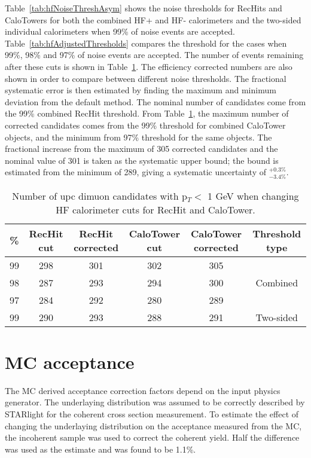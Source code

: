     Table~\ref{tab:hfNoiseThreshAsym} shows the noise thresholds for RecHits 
      and CaloTowers for both the combined HF+ and HF- calorimeters and the 
      two-sided individual calorimeters when 99\% of noise events are accepted.
    Table~\ref{tab:hfAdjustedThresholds} compares the threshold for the cases 
      when 99\%, 98\% and 97\% of noise events are accepted.
    The number of \JPsi{} events remaining after these cuts is shown in 
      Table~\ref{tab:hfAdjThreshYields}. 
    The efficiency corrected numbers are also shown in order to compare between
      different noise thresholds. 
    The fractional systematic error is then estimated by finding the maximum 
      and minimum deviation from the default method. 
    The nominal number of candidates come from the 99\% combined RecHit 
      threshold.
    From Table~\ref{tab:hfAdjThreshYields}, the maximum number of corrected 
      candidates comes from the 99\% threshold for combined CaloTower objects,
      and the minimum from 97\% threshold for the same objects. 
    The fractional increase from the maximum of 305 corrected candidates and 
      the nominal value of 301 is taken as the systematic upper bound; the 
      bound is estimated from the minimum of 289, giving a systematic 
      uncertainty of $^{+0.3\%}_{-3.4\%}$.
    \begin{table}[!Hhbt]
      \centering
        \begin{tabular}{|c|c|c|c|c|c|} \hline
          \% &  RecHit cut & RecHit corrected & CaloTower cut & CaloTower corrected & Threshold type \\ \hline
          99 & 298 & 301 & 302 & 305 & \multirow{3}{*}{Combined} \\ \hhline{-----~}
          98 & 287 & 293 & 294 & 300 & \\ \hhline{-----~}
          97 & 284 & 292 & 280 & 289 & \\ \hline \hline
          99 & 290 & 293 & 288 & 291 & Two-sided \\ \hline
        \end{tabular}
      \caption{Number of upc dimuon candidates with  p$_{T} <$ 1 GeV when changing HF calorimeter cuts for RecHit and CaloTower.}
      \label{tab:hfAdjThreshYields}
    \end{table}

  \section{MC acceptance}
    The MC derived acceptance correction factors depend on the input physics
      generator. 
    The underlaying \pt{} distribution was assumed to be correctly 
      described by STARlight for the coherent cross section measurement.
    To estimate the effect of changing the underlaying \pt{} distribution 
      on the acceptance measured from the MC, the incoherent sample was used 
      to correct the coherent yield.
    Half the difference was used as the estimate and was found to be 1.1\%.

